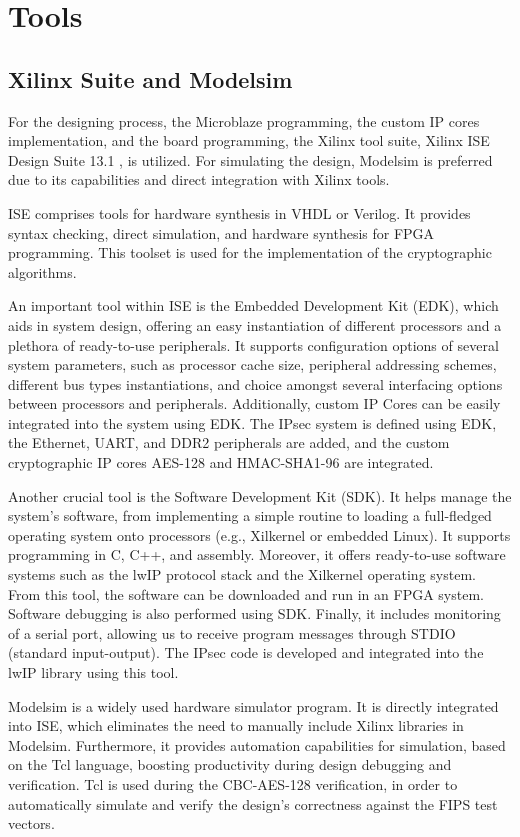 
\section{Tools}
\subsection{Xilinx Suite and Modelsim}
For the designing process, the Microblaze programming, the custom IP cores implementation, and the board programming, the Xilinx tool suite, Xilinx ISE Design Suite 13.1 \cite{xilinx_ise_13_1}, is utilized. For simulating the design, Modelsim is preferred due to its capabilities and direct integration with Xilinx tools.

ISE comprises tools for hardware synthesis in VHDL or Verilog. It provides syntax checking, direct simulation, and hardware synthesis for FPGA programming. This toolset is used for the implementation of the cryptographic algorithms.

An important tool within ISE is the Embedded Development Kit (EDK), which aids in system design, offering an easy instantiation of different processors and a plethora of ready-to-use peripherals. It supports configuration options of several system parameters, such as processor cache size, peripheral addressing schemes, different bus types instantiations, and choice amongst several interfacing options between processors and peripherals. Additionally, custom IP Cores can be easily integrated into the system using EDK. The IPsec system is defined using EDK, the Ethernet, UART, and DDR2 peripherals are added, and the custom cryptographic IP cores AES-128 and HMAC-SHA1-96 are integrated.

Another crucial tool is the Software Development Kit (SDK). It helps manage the system's software, from implementing a simple routine to loading a full-fledged operating system onto processors (e.g., Xilkernel or embedded Linux). It supports programming in C, C++, and assembly. Moreover, it offers ready-to-use software systems such as the lwIP protocol stack and the Xilkernel operating system. From this tool, the software can be downloaded and run in an FPGA system. Software debugging is also performed using SDK. Finally, it includes monitoring of a serial port, allowing us to receive program messages through STDIO (standard input-output). The IPsec code is developed and integrated into the lwIP library using this tool.

Modelsim is a widely used hardware simulator program. It is directly integrated into ISE, which eliminates the need to manually include Xilinx libraries in Modelsim. Furthermore, it provides automation capabilities for simulation, based on the Tcl language, boosting productivity during design 
 debugging and verification. Tcl is used during the CBC-AES-128 verification, in order to automatically simulate and verify the design's correctness against the FIPS test vectors.

